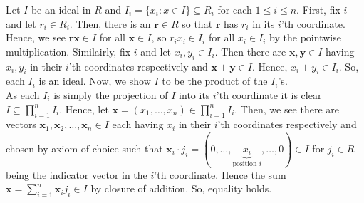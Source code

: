 \documentclass[a4paper]{article}
\begin{document}
\begin{problem}[4]
Let \(I\) be an ideal in \(R\) and \(I_i = \{x_i :  x\in I\} \subseteq R_i\) for each \(1 \le i \le n\). First, fix \(i\) and let \(r_{i} \in R_i\). Then, there is an \(\textbf{r}\in R\) so that \(\textbf{r}\) has \(r_{i}\) in its \(i\)'th coordinate. Hence, we see \(\textbf{r}\textbf{x} \in I\) for all \(\textbf{x} \in I\), so \(r_ix_i \in I_i\) for all \(x_i \in I_i\) by the pointwise multiplication. Similairly, fix \(i\) and let \(x_{i}, y_{i} \in I_{i}\). Then there are \(\textbf{x}, \textbf{y} \in I\) having \(x_{i}, y_{i}\) in their \(i\)'th coordinates respectively and \(\textbf{x} + \textbf{y}\in I\). Hence, \(x_{i} + y_{i} \in I_{i}\). So, each \(I_{i}\) is an ideal. Now, we show \(I\) to be the product of the \(I_{i}\)'s.\\
As each \(I_{i}\) is simply the projection of \(I\) into its \(i\)'th coordinate it is clear \(I \subseteq \prod_{i= 1}^{n} I_{i} \). Hence, let \(\textbf{x} = \left( x_1, \ldots, x_{n} \right) \in \prod_{i= 1}^{n} I_{i} \). Then, we see there are vectors \(\textbf{x}_1, \textbf{x}_2, \ldots, \textbf{x}_{n} \in I\) each having \(x_{i}\) in their \(i\)'th coordinates respectively and chosen by axiom of choice such that \(\textbf{x}_i \cdot j_{i} = \left( 0, \ldots, \underbrace{x_{i}}_{\text{position } i}, \ldots, 0  \right)  \in I \) for \(j_{i} \in R\) being the indicator vector in the \(i\)'th coordinate. Hence the sum \(\textbf{x} = \sum_{i= 1}^{n} \textbf{x}_{i} j_{i} \in I\) by closure of addition. So, equality holds.
\end{problem}
\newpage
\end{document}
